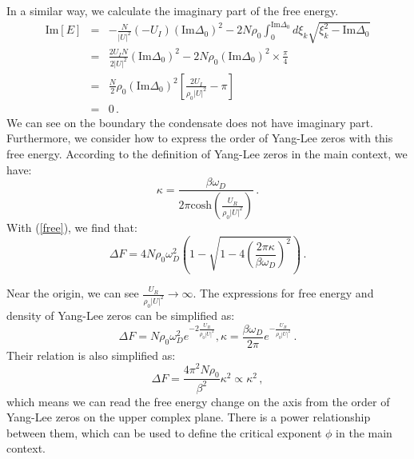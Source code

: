 \documentclass[aps,onecolumn,nofootinbib,superscriptaddress,notitlepage,longbibliography]{revtex4-1}
\begin{document}
In a similar way, we calculate the imaginary part of the free energy.
\begin{eqnarray}
\text{Im}[E] & = & -\frac{N}{|U|^{2}}\left(-U_{I}\right)\left(\text{Im}\Delta_{0}\right)^{2}-2N\rho_{0}\int_{0}^{\text{Im}\Delta_{0}}d\xi_{k}\sqrt{\xi_{k}^{2}-\text{Im}\Delta_{0}}\nonumber \\
 & = & \frac{2U_{I}N}{2|U|^{2}}\left(\text{Im}\Delta_{0}\right)^{2}-2N\rho_{0}\left(\text{Im}\Delta_{0}\right)^{2}\times\frac{\pi}{4}\nonumber \\
 & = & \frac{N}{2}\rho_{0}\left(\text{Im}\Delta_{0}\right)^{2}\left[\frac{2U_{I}}{\rho_{0}|U|^{2}}-\pi\right]\nonumber \\
 & = & 0\,.
\end{eqnarray}
We can see on the boundary the condensate does not have imaginary
part. Furthermore, we consider how to express the order of Yang-Lee
zeros with this free energy. According to the definition of Yang-Lee
zeros in the main context, we have: 
\begin{equation}
\kappa=\frac{\beta\omega_{D}}{2\pi\text{cosh}(\frac{U_{R}}{\rho_{0}|U|^{2}})}\,.
\end{equation}
With (\ref{free}), we find that: 
\begin{equation}
\Delta F=4N\rho_{0}\omega_{D}^{2}(1-\sqrt{1-4(\frac{2\pi\kappa}{\beta\omega_{D}})^{2}})\,.
\end{equation}

Near the origin, we can see $\frac{U_{R}}{\rho_{0}|U|^{2}}\rightarrow\infty$.
The expressions for free energy and density of Yang-Lee zeros can
be simplified as: 
\begin{equation}
\Delta F=N\rho_{0}\omega_{D}^{2}e^{-2\frac{U_{R}}{\rho_{0}|U|^{2}}},\kappa=\frac{\beta\omega_{D}}{2\pi}e^{-\frac{U_{R}}{\rho_{0}|U|^{2}}}\,.
\end{equation}
Their relation is also simplified as: 
\begin{equation}
\Delta F=\frac{4\pi^{2}N\rho_{0}}{\beta^{2}}\kappa^{2}\propto\kappa^{2}\,,
\end{equation}
which means we can read the free energy change on the axis from the
order of Yang-Lee zeros on the upper complex plane. There is a power
relationship between them, which can be used to define the critical
exponent $\phi$ in the main context.
\end{document}

